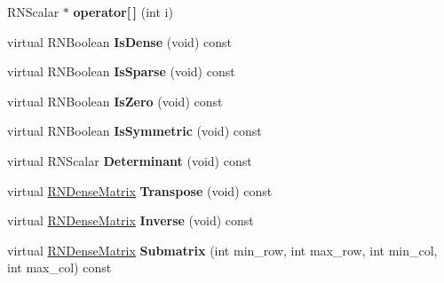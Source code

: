 \begin{DoxyCompactItemize}
\item 
R\+N\+Scalar $\ast$ {\bfseries operator\mbox{[}$\,$\mbox{]}} (int i)\hypertarget{class_r_n_dense_matrix_a9ce4ddff47132bea0390f4dcecb0a9a8}{}\label{class_r_n_dense_matrix_a9ce4ddff47132bea0390f4dcecb0a9a8}

\item 
virtual R\+N\+Boolean {\bfseries Is\+Dense} (void) const \hypertarget{class_r_n_dense_matrix_a5301626aabb5ad50d13e81f8d11deb41}{}\label{class_r_n_dense_matrix_a5301626aabb5ad50d13e81f8d11deb41}

\item 
virtual R\+N\+Boolean {\bfseries Is\+Sparse} (void) const \hypertarget{class_r_n_dense_matrix_a65883d4436f5df47f7908966ec01913d}{}\label{class_r_n_dense_matrix_a65883d4436f5df47f7908966ec01913d}

\item 
virtual R\+N\+Boolean {\bfseries Is\+Zero} (void) const \hypertarget{class_r_n_dense_matrix_ad048eb91435a240a3b916116fa61b278}{}\label{class_r_n_dense_matrix_ad048eb91435a240a3b916116fa61b278}

\item 
virtual R\+N\+Boolean {\bfseries Is\+Symmetric} (void) const \hypertarget{class_r_n_dense_matrix_a6ad0bd71fcd9caaa63697f25e68e7649}{}\label{class_r_n_dense_matrix_a6ad0bd71fcd9caaa63697f25e68e7649}

\item 
virtual R\+N\+Scalar {\bfseries Determinant} (void) const \hypertarget{class_r_n_dense_matrix_a27405f682a59d595f348efb6966a6e88}{}\label{class_r_n_dense_matrix_a27405f682a59d595f348efb6966a6e88}

\item 
virtual \hyperlink{class_r_n_dense_matrix}{R\+N\+Dense\+Matrix} {\bfseries Transpose} (void) const \hypertarget{class_r_n_dense_matrix_a5b1c412c1f10fb44ebe735d316981101}{}\label{class_r_n_dense_matrix_a5b1c412c1f10fb44ebe735d316981101}

\item 
virtual \hyperlink{class_r_n_dense_matrix}{R\+N\+Dense\+Matrix} {\bfseries Inverse} (void) const \hypertarget{class_r_n_dense_matrix_a52399d20f5fc28a6f68b759a609da1a3}{}\label{class_r_n_dense_matrix_a52399d20f5fc28a6f68b759a609da1a3}

\item 
virtual \hyperlink{class_r_n_dense_matrix}{R\+N\+Dense\+Matrix} {\bfseries Submatrix} (int min\+\_\+row, int max\+\_\+row, int min\+\_\+col, int max\+\_\+col) const \hypertarget{class_r_n_dense_matrix_a5fe2d41e14e78a4b49b551a5df7359f6}{}\label{class_r_n_dense_matrix_a5fe2d41e14e78a4b49b551a5df7359f6}


\end{DoxyCompactItemize}

